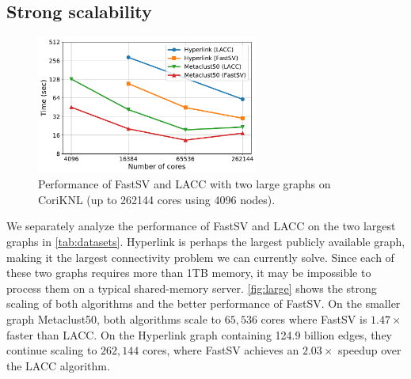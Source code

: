 \documentclass{sokendai_thesis} %
\newcommand{\Name}[0]{FastSV} %
\begin{document}
\subsection{Strong scalability}

\begin{figure}[t]
\centering
\includegraphics[width=0.65\textwidth]{figures/large-graph.pdf}
\vspace{-5pt}
\caption{Performance of \Name{} and LACC with two large graphs on CoriKNL (up to 262144 cores using 4096 nodes).}
\vspace{-10pt}
\label{fig:large}
\end{figure}

We separately analyze the performance of \Name{} and LACC on the two largest graphs in \autoref{tab:datasets}.
Hyperlink is perhaps the largest publicly available graph, making it the largest connectivity problem we can currently solve.
Since each of these two graphs requires more than 1TB memory, it may be impossible to process them on a typical shared-memory server.
\autoref{fig:large} shows the strong scaling of both algorithms and the better performance of \Name{}.
On the smaller graph Metaclust50, both algorithms scale to $65,536$ cores where \Name{} is $1.47\times$ faster than LACC.
On the Hyperlink graph containing 124.9 billion edges, they continue scaling to $262,144$ cores, where \Name{} achieves an $2.03\times$ speedup over the LACC algorithm.


\end{document}
